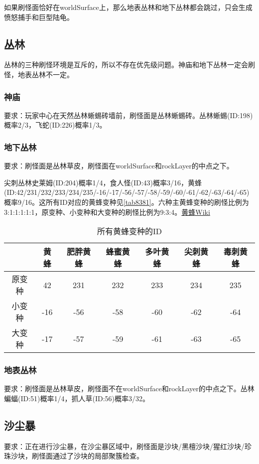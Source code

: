 \begin{remark}
如果刷怪面恰好在worldSurface上，那么地表丛林和地下丛林都会跳过，只会生成愤怒捕手和巨型陆龟。
\end{remark}

\subsection{丛林}
丛林的三种刷怪环境是互斥的，所以不存在优先级问题。神庙和地下丛林一定会刷怪，地表丛林不一定。

\subsubsection{神庙}
要求：玩家中心在天然丛林蜥蜴砖墙前，刷怪面是丛林蜥蜴砖。丛林蜥蜴(ID:198)概率2/3，飞蛇(ID:226)概率1/3。

\subsubsection{地下丛林}
要求：刷怪面是丛林草皮，刷怪面在worldSurface和rockLayer的中点之下。

尖刺丛林史莱姆(ID:204)概率1/4，食人怪(ID:43)概率3/16，黄蜂(ID:42/231/232/233/234/235/-16/-17/-56/-57/-58/-59/-60/-61/-62/-63/-64/-65)概率9/16。这所有ID对应的黄蜂变种见\autoref{tab8381}。六种主黄蜂变种的刷怪比例为3:1:1:1:1:1，原变种、小变种和大变种的刷怪比例为9:3:4。\href{https://terraria-zh.gamepedia.com/黄蜂}{黄蜂Wiki}

\begin{table}[!h]
    \centering
    \begin{tabular}{c|cccccc}
         &黄蜂&肥胖黄蜂&蜂蜜黄蜂&多叶黄蜂&尖刺黄蜂&毒刺黄蜂\\\hline
         原变种&42&231&232&233&234&235\\
         小变种&-16&-56&-58&-60&-62&-64\\
         大变种&-17&-57&-59&-61&-63&-65
    \end{tabular}
    \caption{所有黄蜂变种的ID}
    \label{tab8381}
\end{table}

\subsubsection{地表丛林}
要求：刷怪面是丛林草皮，刷怪面不在worldSurface和rockLayer的中点之下。丛林蝙蝠(ID:51)概率1/4，抓人草(ID:56)概率3/32。

\subsection{沙尘暴}
要求：正在进行沙尘暴，在沙尘暴区域中，刷怪面是沙块/黑檀沙块/猩红沙块/珍珠沙块，刷怪面通过了沙块的局部聚簇检查。

